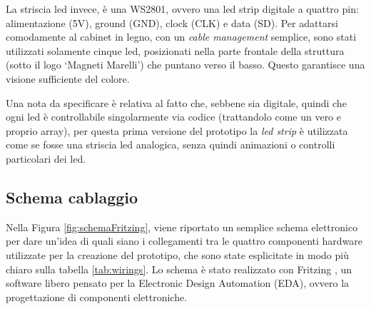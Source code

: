 \documentclass[12pt,a4paper]{report}
\begin{document}
La striscia led invece, è una WS2801, ovvero una led strip digitale a quattro pin: alimentazione (5V), ground (GND), clock (CLK) e data (SD). 
Per adattarsi comodamente al cabinet in legno, con un \textit{cable management} semplice, sono stati utilizzati solamente cinque led, posizionati nella parte frontale della struttura (sotto il logo `Magneti Marelli') che puntano verso il basso. Questo garantisce una visione sufficiente del colore.

Una nota da specificare è relativa al fatto che, sebbene sia digitale, quindi che ogni led è controllabile singolarmente via codice (trattandolo come un vero e proprio array), per questa prima versione del prototipo la \textit{led strip} è utilizzata come se fosse una striscia led analogica, senza quindi animazioni o controlli particolari dei led. 


\subsection{Schema cablaggio} 

Nella Figura \ref{fig:schemaFritzing}, viene riportato un semplice schema elettronico per dare un'idea di quali siano i collegamenti tra le quattro componenti hardware utilizzate per la creazione del prototipo, che sono state esplicitate in modo più chiaro sulla tabella \ref{tab:wirings}. Lo schema è stato realizzato con Fritzing \cite{fritzing}, un software libero pensato per la Electronic Design Automation (EDA), ovvero la progettazione di componenti elettroniche. \\
\end{document}
